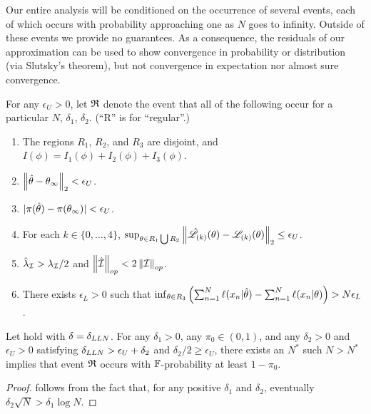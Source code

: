 Our entire analysis will be conditioned on the occurrence of several events,
each of which occurs with probability approaching one as $N$ goes to infinity.
Outside of these events we provide no guarantees.  As a consequence, the
residuals of our approximation can be used to show convergence in probability
or distribution (via Slutsky's theorem), but not convergence in expectation
nor almost sure convergence.

%



\begin{lem}
For any $\epsilon_U > 0$, let $\mathfrak{R}$
denote the event that all of the following occur
for a particular $N$, $\delta_1$, $\delta_2$.
(``R'' is for ``regular''.)
%
\begin{enumerate}
%
\item {} The regions $R_1$, $R_2$, and $R_3$ are
disjoint, and $I(\phi) = I_1(\phi) + I_2(\phi) + I_3(\phi)$.
%
\item {}
$\left\Vert \hat\theta - \theta_{\infty}\right\Vert_2 < \epsilon_U$.
%
\item {}
    $|\pi(\hat\theta) - \pi(\theta_{\infty})| < \epsilon_U$.
%
\item {} For each $k \in \{0, \ldots, 4\}$,
$\sup_{\theta \in R_1 \bigcup R_2}
    \left\Vert \hat{\mathscr{L}}_{(k)}(\theta) - \mathscr{L}_{(k)}(\theta)\right\Vert_2 \le \epsilon_U$.
%
\item {} $\hat{\lambda}_\mathcal{I} > \lambda_\mathcal{I} / 2$ and
$\left\Vert \hat{\mathcal{I}}\right\Vert_{op} < 2\left\Vert \mathcal{I}\right\Vert_{op}$.
%
\item {} There exists $\epsilon_L > 0$ such that
%
$\inf_{\theta \in R_3}
\left( \sum_{n=1}^N \ell(x_n \vert \hat\theta) -
       \sum_{n=1}^N \ell(x_n \vert \theta)
\right) > N \epsilon_L$.
\end{enumerate}

Let  hold with $\delta = \delta_{LLN}$. For any $\delta_1 > 0$,
any $\pi_0 \in (0,1)$, and any $\delta_2 > 0$ and $\epsilon_U > 0$ satisfying
$\delta_{LLN} > \epsilon_U + \delta_2$ and $\delta_2 / 2 \ge \epsilon_U$, there
exists an $N^*$ such $N > N^*$ implies that event $\mathfrak{R}$ occurs with
$\mathbb{F}$-probability at least $1 - \pi_0$.
%
\begin{proof}
%
 follows from the fact that, for any positive
$\delta_1$ and $\delta_2$, eventually $\delta_2 \sqrt{N} > \delta_1 \log N$.


\end{proof}
\end{lem}
